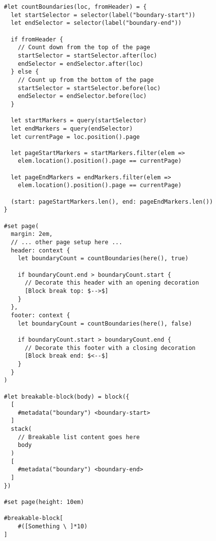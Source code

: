 \begin{verbatim}
#let countBoundaries(loc, fromHeader) = {
  let startSelector = selector(label("boundary-start"))
  let endSelector = selector(label("boundary-end"))

  if fromHeader {
    // Count down from the top of the page
    startSelector = startSelector.after(loc)
    endSelector = endSelector.after(loc)
  } else {
    // Count up from the bottom of the page
    startSelector = startSelector.before(loc)
    endSelector = endSelector.before(loc)
  }

  let startMarkers = query(startSelector)
  let endMarkers = query(endSelector)
  let currentPage = loc.position().page

  let pageStartMarkers = startMarkers.filter(elem =>
    elem.location().position().page == currentPage)

  let pageEndMarkers = endMarkers.filter(elem =>
    elem.location().position().page == currentPage)

  (start: pageStartMarkers.len(), end: pageEndMarkers.len())
}

#set page(
  margin: 2em,
  // ... other page setup here ...
  header: context {
    let boundaryCount = countBoundaries(here(), true)

    if boundaryCount.end > boundaryCount.start {
      // Decorate this header with an opening decoration
      [Block break top: $-->$]
    }
  },
  footer: context {
    let boundaryCount = countBoundaries(here(), false)

    if boundaryCount.start > boundaryCount.end {
      // Decorate this footer with a closing decoration
      [Block break end: $<--$]
    }
  }
)

#let breakable-block(body) = block({
  [
    #metadata("boundary") <boundary-start>
  ]
  stack(
    // Breakable list content goes here
    body
  )
  [
    #metadata("boundary") <boundary-end>
  ]
})

#set page(height: 10em)

#breakable-block[
    #([Something \ ]*10)
]
\end{verbatim}

\pandocbounded{}

\pandocbounded{}
